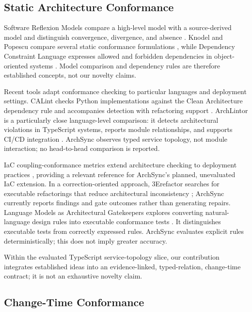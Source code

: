 \subsection{Static Architecture Conformance}

Software Reflexion Models compare a high-level model with a source-derived model and distinguish convergence, divergence, and absence \cite{murphy1995reflexion}. Knodel and Popescu compare several static conformance formulations \cite{knodel2007comparison}, while Dependency Constraint Language expresses allowed and forbidden dependencies in object-oriented systems \cite{terra2009dcl}. Model comparison and dependency rules are therefore established concepts, not our novelty claims.

Recent tools adapt conformance checking to particular languages and deployment settings. CALint checks Python implementations against the Clean Architecture dependency rule and accompanies detection with refactoring support \cite{calint2022}. ArchLintor is a particularly close language-level comparison: it detects architectural violations in TypeScript systems, reports module relationships, and supports CI/CD integration \cite{archlintor2025}. ArchSync observes typed service topology, not module interaction; no head-to-head comparison is reported.

IaC coupling-conformance metrics extend architecture checking to deployment practices \cite{ntentos2022iac}, providing a relevant reference for ArchSync's planned, unevaluated IaC extension. In a correction-oriented approach, 3Erefactor searches for executable refactorings that reduce architectural inconsistency \cite{refactor2024}; ArchSync currently reports findings and gate outcomes rather than generating repairs. Language Models as Architectural Gatekeepers explores converting natural-language design rules into executable conformance tests \cite{lucena2025gatekeepers}. It distinguishes executable tests from correctly expressed rules. ArchSync evaluates explicit rules deterministically; this does not imply greater accuracy.

Within the evaluated TypeScript service-topology slice, our contribution integrates established ideas into an evidence-linked, typed-relation, change-time contract; it is not an exhaustive novelty claim.

\subsection{Change-Time Conformance}

